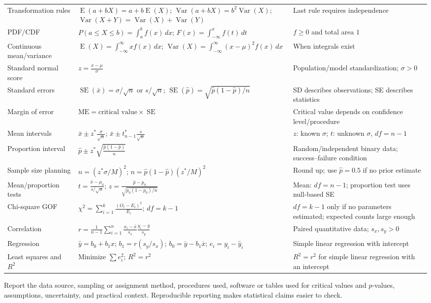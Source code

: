 \documentclass[11pt]{article}
\newcommand{\E}{\operatorname{E}}
\newcommand{\Var}{\operatorname{Var}}
\newcommand{\SE}{\operatorname{SE}}
\begin{document}
\begin{center}
\begin{tabularx}{\textwidth}{@{}lYY@{}}
Transformation rules & $\E(a+bX)=a+b\E(X)$; $\Var(a+bX)=b^2\Var(X)$; $\Var(X+Y)=\Var(X)+\Var(Y)$ & Last rule requires independence \\
PDF/CDF & $P(a\le X\le b)=\int_a^bf(x)\,dx$; $F(x)=\int_{-\infty}^xf(t)\,dt$ & $f\ge0$ and total area $1$ \\
Continuous mean/variance & $\E(X)=\int_{-\infty}^{\infty}xf(x)\,dx$; $\Var(X)=\int_{-\infty}^{\infty}(x-\mu)^2f(x)\,dx$ & When integrals exist \\
Standard normal score & $\displaystyle z=\frac{x-\mu}{\sigma}$ & Population/model standardization; $\sigma>0$ \\
Standard errors & $\SE(\bar{x})=\sigma/\sqrt n$ or $s/\sqrt n$; $\SE(\widehat p)=\sqrt{\widehat p(1-\widehat p)/n}$ & SD describes observations; SE describes statistics \\
Margin of error & $\mathrm{ME}=\text{critical value}\times\SE$ & Critical value depends on confidence level/procedure \\
Mean intervals & $\displaystyle \bar{x}\pm z^*\frac{\sigma}{\sqrt n}$; $\displaystyle \bar{x}\pm t^*_{n-1}\frac{s}{\sqrt n}$ & $z$: known $\sigma$; $t$: unknown $\sigma$, $df=n-1$ \\
Proportion interval & $\displaystyle \widehat p\pm z^*\sqrt{\frac{\widehat p(1-\widehat p)}{n}}$ & Random/independent binary data; success--failure condition \\
Sample size planning & $\displaystyle n=(z^*\sigma/M)^2$; $\displaystyle n=\widehat p(1-\widehat p)(z^*/M)^2$ & Round up; use $\widehat p=0.5$ if no prior estimate \\
Mean/proportion tests & $\displaystyle t=\frac{\bar{x}-\mu_0}{s/\sqrt n}$; $\displaystyle z=\frac{\widehat p-p_0}{\sqrt{p_0(1-p_0)/n}}$ & Mean: $df=n-1$; proportion test uses null-based SE \\
Chi-square GOF & $\displaystyle \chi^2=\sum_{i=1}^{k}\frac{(O_i-E_i)^2}{E_i}$; $df=k-1$ & $df=k-1$ only if no parameters estimated; expected counts large enough \\
Correlation & $\displaystyle r=\frac1{n-1}\sum_{i=1}^{n}\frac{x_i-\bar{x}}{s_x}\frac{y_i-\bar{y}}{s_y}$ & Paired quantitative data; $s_x,s_y>0$ \\
Regression & $\widehat y=b_0+b_1x$; $b_1=r(s_y/s_x)$; $b_0=\bar y-b_1\bar x$; $e_i=y_i-\widehat y_i$ & Simple linear regression with intercept \\
Least squares and $R^2$ & Minimize $\sum e_i^2$; $R^2=r^2$ & $R^2=r^2$ for simple linear regression with an intercept \\
\bottomrule
\end{tabularx}
\end{center}

\begin{keybox}
Report the data source, sampling or assignment method, procedures used,
software or tables used for critical values and $p$-values, assumptions,
uncertainty, and practical context.  Reproducible reporting makes statistical
claims easier to check.
\end{keybox}
\end{document}
